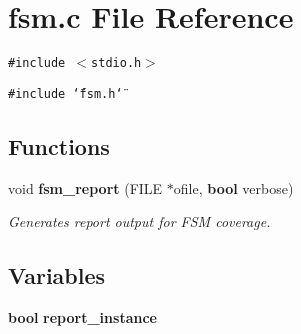\section{fsm.c File Reference}
\label{fsm_8c}
{\tt \#include $<$stdio.h$>$}\par
{\tt \#include \char`\"{}fsm.h\char`\"{}}\par
\subsection*{Functions}
\begin{CompactItemize}
\item 
void {\bf fsm\_\-report} (FILE $\ast$ofile, {\bf bool} verbose)
\begin{CompactList}\small\item\em Generates report output for FSM coverage. \item\end{CompactList}\end{CompactItemize}
\subsection*{Variables}
\begin{CompactItemize}
\item 
{\bf bool} {\bf report\_\-instance}
\end{CompactItemize}


